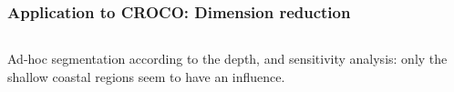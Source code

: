\documentclass[11pt]{beamer}
\newcommand\manupath{/home/victor/acadwriting/Manuscrit/Text/}
\begin{document}

\begin{frame}
  \frametitle{Application to CROCO: Dimension reduction}
  \begin{center}
  \renewcommand\rmfamily{\sffamily}
  \begin{columns}
    \begin{column}{.5\textwidth}
    \end{column}
    \begin{column}{.5\textwidth}
       \resizebox{\textwidth}{!}{}
    \end{column}
  \end{columns}
  \end{center}
Ad-hoc segmentation according to the depth, and sensitivity analysis: only the shallow coastal regions seem to have an influence.
\end{frame}
\end{document}
